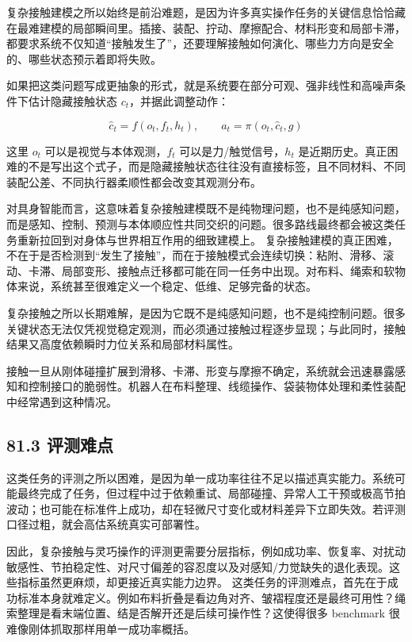 复杂接触建模之所以始终是前沿难题，是因为许多真实操作任务的关键信息恰恰藏在最难建模的局部瞬间里。插接、装配、拧动、摩擦配合、材料形变和局部卡滞，都要求系统不仅知道“接触发生了”，还要理解接触如何演化、哪些力方向是安全的、哪些状态预示着即将失败。

如果把这类问题写成更抽象的形式，就是系统要在部分可观、强非线性和高噪声条件下估计隐藏接触状态 \(c_t\)，并据此调整动作：

\begingroup
\footnotesize
\begin{equation*}
\hat{c}_t = f(o_t, f_t, h_t), \qquad a_t = \pi(o_t, \hat{c}_t, g)
\end{equation*}
\endgroup

这里 \(o_t\) 可以是视觉与本体观测，\(f_t\) 可以是力/触觉信号，\(h_t\) 是近期历史。真正困难的不是写出这个式子，而是隐藏接触状态往往没有直接标签，且不同材料、不同装配公差、不同执行器柔顺性都会改变其观测分布。

对具身智能而言，这意味着复杂接触建模既不是纯物理问题，也不是纯感知问题，而是感知、控制、预测与本体顺应性共同交织的问题。很多路线最终都会被这类任务重新拉回到对身体与世界相互作用的细致建模上。 复杂接触建模的真正困难，不在于是否检测到“发生了接触”，而在于接触模式会连续切换：粘附、滑移、滚动、卡滞、局部变形、接触点迁移都可能在同一任务中出现。对布料、绳索和软物体来说，系统甚至很难定义一个稳定、低维、足够完备的状态。

复杂接触之所以长期难解，是因为它既不是纯感知问题，也不是纯控制问题。很多关键状态无法仅凭视觉稳定观测，而必须通过接触过程逐步显现；与此同时，接触结果又高度依赖瞬时力位关系和局部材料属性。

接触一旦从刚体碰撞扩展到滑移、卡滞、形变与摩擦不确定，系统就会迅速暴露感知和控制接口的脆弱性。机器人在布料整理、线缆操作、袋装物体处理和柔性装配中经常遇到这种情况。

\subsection*{81.3 评测难点}


这类任务的评测之所以困难，是因为单一成功率往往不足以描述真实能力。系统可能最终完成了任务，但过程中过于依赖重试、局部碰撞、异常人工干预或极高节拍波动；也可能在标准件上成功，却在轻微尺寸变化或材料差异下立即失效。若评测口径过粗，就会高估系统真实可部署性。

因此，复杂接触与灵巧操作的评测更需要分层指标，例如成功率、恢复率、对扰动敏感性、节拍稳定性、对尺寸偏差的容忍度以及对感知/力觉缺失的退化表现。这些指标虽然更麻烦，却更接近真实能力边界。 这类任务的评测难点，首先在于成功标准本身就难定义。例如布料折叠是看边角对齐、皱褶程度还是最终可用性？绳索整理是看末端位置、结是否解开还是后续可操作性？这使得很多 benchmark 很难像刚体抓取那样用单一成功率概括。

